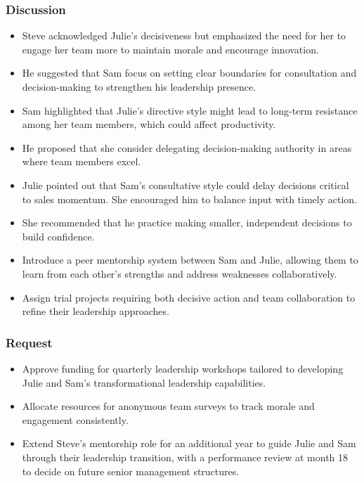 \documentclass[a4paper,10pt]{article}
\begin{document}
\subsubsection{Discussion}

\begin{itemize}
        \item Steve acknowledged Julie’s decisiveness but emphasized the need for her to engage her team more to maintain morale and encourage innovation.
        \item He suggested that Sam focus on setting clear boundaries for consultation and decision-making to strengthen his leadership presence.
    \end{itemize}
    \begin{itemize}
        \item Sam highlighted that Julie’s directive style might lead to long-term resistance among her team members, which could affect productivity.
        \item He proposed that she consider delegating decision-making authority in areas where team members excel.
    \end{itemize}
    \begin{itemize}
        \item Julie pointed out that Sam’s consultative style could delay decisions critical to sales momentum. She encouraged him to balance input with timely action.
        \item She recommended that he practice making smaller, independent decisions to build confidence.
    \end{itemize}
    \begin{itemize}
        \item Introduce a peer mentorship system between Sam and Julie, allowing them to learn from each other’s strengths and address weaknesses collaboratively.
        \item Assign trial projects requiring both decisive action and team collaboration to refine their leadership approaches.
    \end{itemize}

\subsubsection{Request}

\begin{itemize}
    \item Approve funding for quarterly leadership workshops tailored to developing Julie and Sam’s transformational leadership capabilities.
    \item Allocate resources for anonymous team surveys to track morale and engagement consistently.
    \item Extend Steve’s mentorship role for an additional year to guide Julie and Sam through their leadership transition, with a performance review at month 18 to decide on future senior management structures.
\end{itemize}
\end{document}
